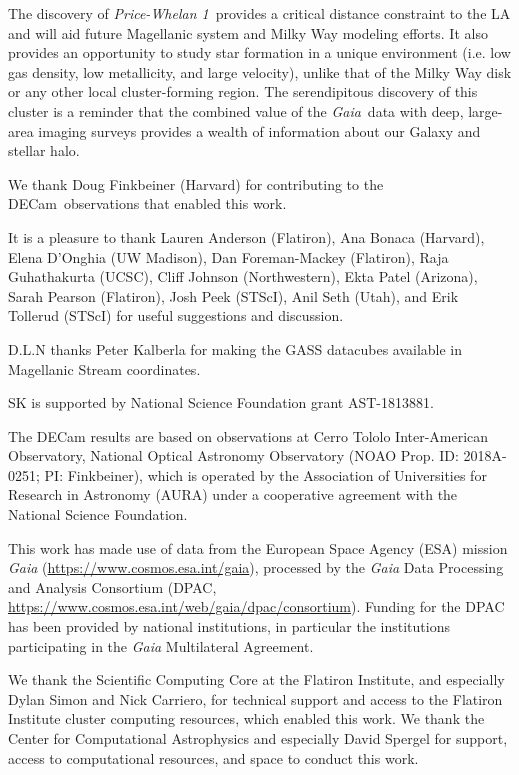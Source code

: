 \documentclass[twocolumn]{aastex62}
\newcommand{\gaia}{\textsl{Gaia}}
\newcommand{\decam}{DECam}
\newcommand{\clustername}{\textsl{Price-Whelan 1}}
\begin{document}
The discovery of \clustername\ provides a critical distance constraint to the LA and will aid future Magellanic system and Milky Way modeling efforts.
It also provides an opportunity to study star formation in a unique environment (i.e. low gas density, low metallicity, and large velocity), unlike that of the Milky Way disk or any other local cluster-forming region.
The serendipitous discovery of this cluster is a reminder that the combined value of the \gaia\ data with deep, large-area imaging surveys provides a wealth of information about our Galaxy and stellar halo.


\acknowledgments

We thank Doug Finkbeiner (Harvard) for contributing to the \decam\ observations that enabled this work.

It is a pleasure to thank
Lauren Anderson (Flatiron),
Ana Bonaca (Harvard),
Elena D'Onghia (UW Madison),
Dan Foreman-Mackey (Flatiron),
Raja Guhathakurta (UCSC),
Cliff Johnson (Northwestern),
Ekta Patel (Arizona),
Sarah Pearson (Flatiron),
Josh Peek (STScI),
Anil Seth (Utah),
and Erik Tollerud (STScI)
for useful suggestions and discussion.

D.L.N thanks Peter Kalberla for making the GASS datacubes available in Magellanic Stream coordinates.

SK is supported by National Science Foundation grant AST-1813881.

The DECam results are based on observations at Cerro Tololo Inter-American Observatory, National Optical Astronomy Observatory (NOAO Prop. ID: 2018A-0251; PI: Finkbeiner), which is operated by the Association of Universities for Research in Astronomy (AURA) under a cooperative agreement with the National Science Foundation.

This work has made use of data from the European Space Agency (ESA)
mission {\it Gaia} (\url{https://www.cosmos.esa.int/gaia}), processed by
the {\it Gaia} Data Processing and Analysis Consortium (DPAC,
\url{https://www.cosmos.esa.int/web/gaia/dpac/consortium}). Funding
for the DPAC has been provided by national institutions, in particular
the institutions participating in the {\it Gaia} Multilateral Agreement.

We thank the Scientific Computing Core at the Flatiron Institute, and especially Dylan Simon and Nick Carriero, for technical support and access to the Flatiron Institute cluster computing resources, which enabled this work.
We thank the Center for Computational Astrophysics and especially David Spergel for support, access to computational resources, and space to conduct this work.
\end{document}
